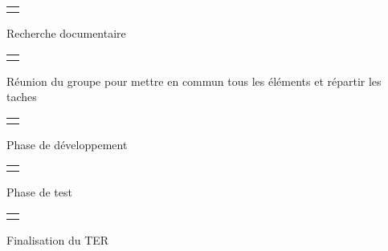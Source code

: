 \noindent \begin{tabular}{l}
	 \rowcolor{green} \\  
\end{tabular}
Recherche documentaire\\

\noindent \begin{tabular}{l}
     \rowcolor{blue} \\  
\end{tabular}
Réunion du groupe pour mettre en commun tous les éléments et répartir les taches \\

\noindent \begin{tabular}{l}
     \rowcolor{orange} \\  
\end{tabular}
Phase de développement\\

\noindent \begin{tabular}{l}
     \rowcolor{cyan} \\  
\end{tabular}
Phase de test\\

\noindent \begin{tabular}{l}
     \rowcolor{yellow} \\  
\end{tabular}
Finalisation du TER\\
